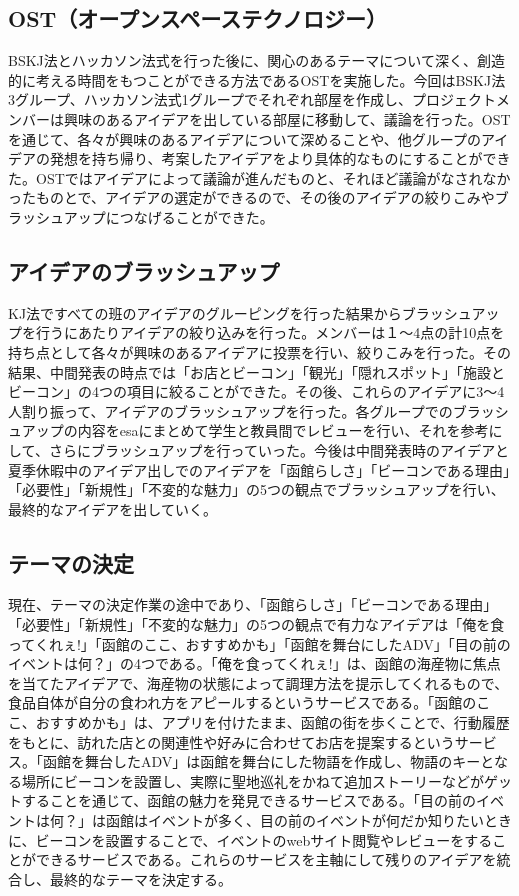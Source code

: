 \subsection{OST（オープンスペーステクノロジー）}
BSKJ法とハッカソン法式を行った後に、関心のあるテーマについて深く、創造的に考える時間をもつことができる方法であるOSTを実施した。今回はBSKJ法3グループ、ハッカソン法式1グループでそれぞれ部屋を作成し、プロジェクトメンバーは興味のあるアイデアを出している部屋に移動して、議論を行った。OSTを通じて、各々が興味のあるアイデアについて深めることや、他グループのアイデアの発想を持ち帰り、考案したアイデアをより具体的なものにすることができた。OSTではアイデアによって議論が進んだものと、それほど議論がなされなかったものとで、アイデアの選定ができるので、その後のアイデアの絞りこみやブラッシュアップにつなげることができた。

\subsection{アイデアのブラッシュアップ}
KJ法ですべての班のアイデアのグルーピングを行った結果からブラッシュアップを行うにあたりアイデアの絞り込みを行った。メンバーは１～4点の計10点を持ち点として各々が興味のあるアイデアに投票を行い、絞りこみを行った。その結果、中間発表の時点では「お店とビーコン」「観光」「隠れスポット」「施設とビーコン」の4つの項目に絞ることができた。その後、これらのアイデアに3～4人割り振って、アイデアのブラッシュアップを行った。各グループでのブラッシュアップの内容をesaにまとめて学生と教員間でレビューを行い、それを参考にして、さらにブラッシュアップを行っていった。今後は中間発表時のアイデアと夏季休暇中のアイデア出しでのアイデアを「函館らしさ」「ビーコンである理由」「必要性」「新規性」「不変的な魅力」の5つの観点でブラッシュアップを行い、最終的なアイデアを出していく。

\subsection{テーマの決定}
現在、テーマの決定作業の途中であり、「函館らしさ」「ビーコンである理由」「必要性」「新規性」「不変的な魅力」の5つの観点で有力なアイデアは「俺を食ってくれぇ!」「函館のここ、おすすめかも」「函館を舞台にしたADV」「目の前のイベントは何？」の4つである。「俺を食ってくれぇ!」は、函館の海産物に焦点を当てたアイデアで、海産物の状態によって調理方法を提示してくれるもので、食品自体が自分の食われ方をアピールするというサービスである。「函館のここ、おすすめかも」は、アプリを付けたまま、函館の街を歩くことで、行動履歴をもとに、訪れた店との関連性や好みに合わせてお店を提案するというサービス。「函館を舞台したADV」は函館を舞台にした物語を作成し、物語のキーとなる場所にビーコンを設置し、実際に聖地巡礼をかねて追加ストーリーなどがゲットすることを通じて、函館の魅力を発見できるサービスである。「目の前のイベントは何？」は函館はイベントが多く、目の前のイベントが何だか知りたいときに、ビーコンを設置することで、イベントのwebサイト閲覧やレビューをすることができるサービスである。これらのサービスを主軸にして残りのアイデアを統合し、最終的なテーマを決定する。


